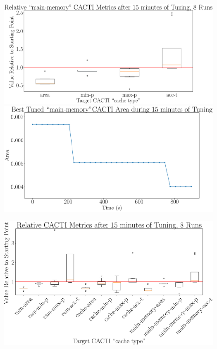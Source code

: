 \documentclass[12pt, a4paper]{article}
\begin{document}
\begin{figure}[htpb]
    \begin{minipage}{.48\textwidth}
        \centering
        \includegraphics[width=.8\textwidth]{target_area_900_main-memory}
    \end{minipage}%
    \begin{minipage}{.48\textwidth}
        \centering
        \includegraphics[width=.8\textwidth]{target_area_900_main-memory_best}
    \end{minipage}%
\end{figure}

\begin{figure}[htpb]
    \centering
    \includegraphics[width=.4\textwidth]{target_area_900}
\end{figure}
\end{document}

